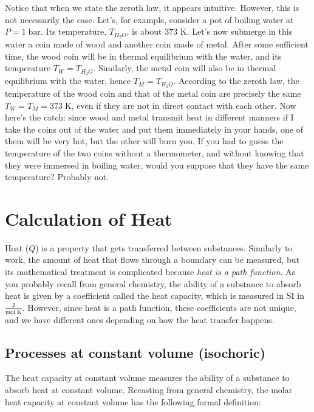 \documentclass[
  9pt,
]{extbook}
\theoremstyle{definition}
\theoremstyle{definition}
\theoremstyle{definition}
\theoremstyle{definition}
\theoremstyle{remark}
\begin{document}
Notice that when we state the zeroth law, it appears intuitive. However, this is not necessarily the case. Let's, for example, consider a pot of boiling water at \(P=1\;\mathrm{bar}\). Its temperature, \(T_{H_2O}\), is about 373 K. Let's now submerge in this water a coin made of wood and another coin made of metal. After some sufficient time, the wood coin will be in thermal equilibrium with the water, and its temperature \(T_W = T_{H_2O}\). Similarly, the metal coin will also be in thermal equilibrium with the water, hence \(T_M = T_{H_2O}\). According to the zeroth law, the temperature of the wood coin and that of the metal coin are precisely the same \(T_W = T_M = 373\;\mathrm{K}\), even if they are not in direct contact with each other. Now here's the catch: since wood and metal transmit heat in different manners if I take the coins out of the water and put them immediately in your hands, one of them will be very hot, but the other will burn you. If you had to guess the temperature of the two coins without a thermometer, and without knowing that they were immersed in boiling water, would you suppose that they have the same temperature? Probably not.

\section{Calculation of Heat}\label{heatint}

Heat (\(Q\)) is a property that gets transferred between substances. Similarly to work, the amount of heat that flows through a boundary can be measured, but its mathematical treatment is complicated because \emph{heat is a path function}.
As you probably recall from general chemistry, the ability of a substance to absorb heat is given by a coefficient called the heat capacity, which is measured in SI in \(\frac{\text{J}}{\text{mol K}}\). However, since heat is a path function, these coefficients are not unique, and we have different ones depending on how the heat transfer happens.

\subsection{Processes at constant volume (isochoric)}\label{processes-at-constant-volume-isochoric}

The heat capacity at constant volume measures the ability of a substance to absorb heat at constant volume. Recasting from general chemistry, the molar heat capacity at constant volume has the following formal definition:
\end{document}
